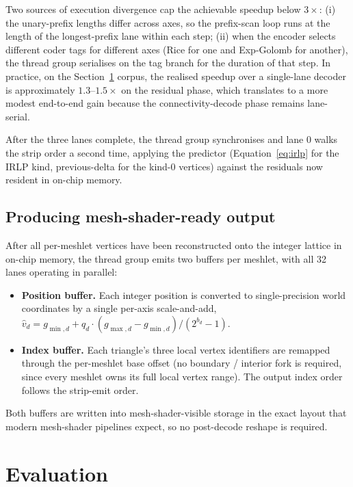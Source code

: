\documentclass[pdflatex,sn-vancouver-num]{sn-jnl}%
\theoremstyle{thmstyleone}%
\theoremstyle{thmstyletwo}%
\theoremstyle{thmstylethree}%
\begin{document}
Two sources of execution divergence cap the achievable speedup below $3\times$: (i) the unary-prefix lengths differ across axes, so the prefix-scan loop runs at the length of the longest-prefix lane within each step; (ii) when the encoder selects different coder tags for different axes (Rice for one and Exp-Golomb for another), the thread group serialises on the tag branch for the duration of that step. In practice, on the Section~\ref{sec:eval} corpus, the realised speedup over a single-lane decoder is approximately $1.3$--$1.5\times$ on the residual phase, which translates to a more modest end-to-end gain because the connectivity-decode phase remains lane-serial.

After the three lanes complete, the thread group synchronises and lane 0 walks the strip order a second time, applying the predictor (Equation~\eqref{eq:irlp} for the IRLP kind, previous-delta for the kind-0 vertices) against the residuals now resident in on-chip memory.

\subsection{Producing mesh-shader-ready output}\label{sec:meshready}

After all per-meshlet vertices have been reconstructed onto the integer lattice in on-chip memory, the thread group emits two buffers per meshlet, with all 32 lanes operating in parallel:

\begin{itemize}
\item \textbf{Position buffer.} Each integer position is converted to single-precision world coordinates by a single per-axis scale-and-add, $\hat{v}_d = g_{\min,d} + q_d \cdot (g_{\max,d} - g_{\min,d}) / (2^{b_d} - 1)$.
\item \textbf{Index buffer.} Each triangle's three local vertex identifiers are remapped through the per-meshlet base offset (no boundary / interior fork is required, since every meshlet owns its full local vertex range). The output index order follows the strip-emit order.
\end{itemize}

Both buffers are written into mesh-shader-visible storage in the exact layout that modern mesh-shader pipelines expect, so no post-decode reshape is required.

\section{Evaluation}\label{sec:eval}
\end{document}
